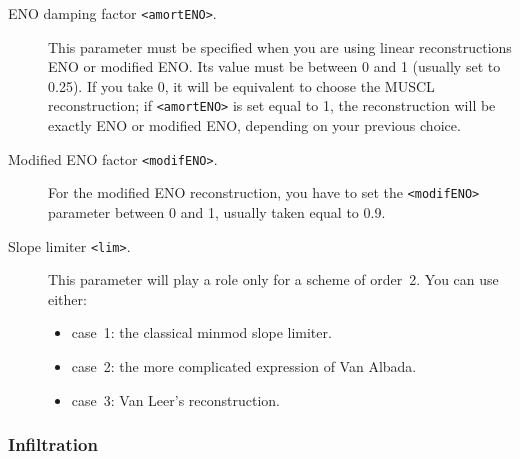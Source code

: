 \documentclass[a4paper, 11pt]{article}
\begin{document}
\begin{description}
	\item[ENO damping factor \texttt{<amortENO>}.] This parameter must be specified when you are using linear reconstructions ENO or modified ENO\@.
	      Its value must be between 0 and 1 (usually set to 0.25).
	      If you take 0, it will be equivalent to choose the MUSCL reconstruction; if \texttt{<amortENO>} is set equal to 1, the reconstruction will be exactly ENO or modified ENO, depending on your previous choice.
	\item[Modified ENO factor \texttt{<modifENO>}.] For the modified ENO reconstruction, you have to set the \texttt{<modifENO>} parameter between 0 and 1, usually taken equal to 0.9.
	\item[Slope limiter \texttt{<lim>}.] This parameter will play a role only for a scheme of order~2.
	      You can use either:
	      \begin{itemize}
		      \item case~1: the classical minmod slope limiter.
		      \item case~2: the more complicated expression of Van Albada.
		      \item case~3: Van Leer's reconstruction.
	      \end{itemize}
\end{description}

\subsubsection{Infiltration}
\end{document}
